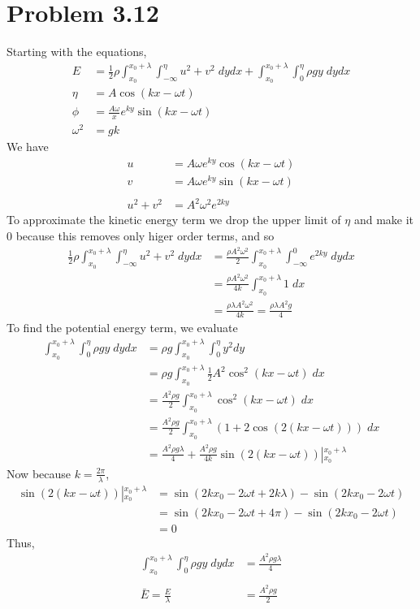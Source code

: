 \documentclass[12pt]{article}
\newcommand{\eq}[1]{\begin{align*}#1\end{align*}}
\begin{document}
\section*{Problem 3.12} Starting with the equations,
\eq{
	E &= \frac{1}{2}\rho\int_{x_0}^{x_0 + \lambda}\int_{-\infty}^\eta u^2 + v^2 \;dydx + \int_{x_0}^{x_0+\lambda}\int_0^\eta \rho gy \;dydx\\
	\eta &= A\cos(kx - \omega t)\\
	\phi &= \frac{A\omega}{x} e^{ky}\sin(kx -\omega t)\\
	\omega^2 &= gk
}
We have
\eq{
	u &= A\omega e^{ky}\cos(kx - \omega t)\\
	v &= A\omega e^{ky}\sin(kx - \omega t)\\
	\\
	u^2 + v^2 &= A^2\omega^2 e^{2ky}
}
To approximate the kinetic energy term we drop the upper limit of $\eta$ and make it $0$ because this removes only higer order terms, and so
\eq{
	\frac{1}{2}\rho\int_{x_0}^{x_0 + \lambda}\int_{-\infty}^\eta u^2 + v^2 \;dydx &= \frac{\rho A^2\omega^2}{2}\int_{x_0}^{x_0 + \lambda} \int_{-\infty}^0 e^{2ky} \;dydx\\
	&= \frac{\rho A^2\omega^2}{4k}\int_{x_0}^{x_0 + \lambda} 1 \;dx\\
	&= \frac{\rho \lambda A^2 \omega^2}{4k} = \frac{\rho\lambda A^2 g}{4}
}
To find the potential energy term, we evaluate
\eq{
	\int_{x_0}^{x_0+\lambda}\int_0^\eta \rho gy \;dydx &= \rho g \int_{x_0}^{x_0+\lambda}\int_0^\eta y^2 dy\\
	&= \rho g \int_{x_0}^{x_0+\lambda} \frac{1}{2} A^2\cos^2(kx - \omega t) \;dx\\
	&= \frac{A^2 \rho g}{2}\int_{x_0}^{x_0+\lambda}\cos^2(kx - \omega t) \; dx\\
	&= \frac{A^2 \rho g}{2}\int_{x_0}^{x_0+\lambda}(1 + 2\cos(2(kx - \omega t))) \; dx\\
	&= \frac{A^2 \rho g \lambda}{4} + \frac{A^2 \rho g}{4k}\sin(2(kx - \omega t)) \left|_{x_0}^{x_0+\lambda}\right.
}
Now because $k = \frac{2\pi}{\lambda}$,
\eq{
	\sin(2(kx - \omega t)) \left|_{x_0}^{x_0+\lambda}\right. &= \sin(2kx_0 - 2\omega t + 2k\lambda) - \sin(2kx_0 - 2\omega t)\\
	&= \sin(2kx_0 - 2\omega t + 4\pi) - \sin(2kx_0 - 2\omega t)\\
	&= 0
}
Thus,
\eq{
	\int_{x_0}^{x_0+\lambda}\int_0^\eta \rho gy \;dydx &= \frac{A^2 \rho g \lambda}{4}\\
	\\
	\bar{E} = \frac{E}{\lambda} &= \frac{A^2\rho g}{2}
}
\end{document}
